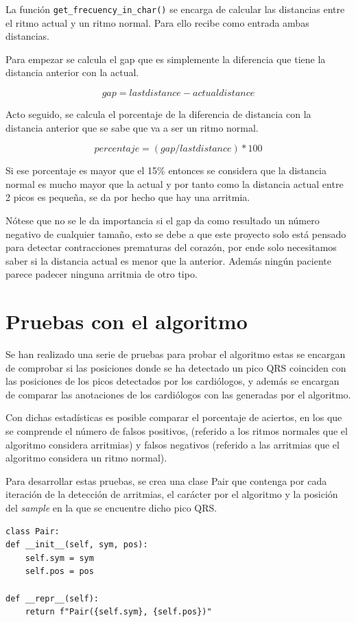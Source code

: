 \FloatBarrier

La función \lstinline{get_frecuency_in_char()} se encarga de calcular las distancias entre el ritmo actual y un ritmo normal. 
Para ello recibe como entrada ambas distancias.

Para empezar se calcula el gap que es simplemente la diferencia que tiene la distancia anterior con la actual.

\[gap = last distance - actual distance\]

Acto seguido, se calcula el porcentaje de la diferencia de distancia con la distancia anterior que se sabe que va a ser 
un ritmo normal.

\[percentaje = (gap / last distance) * 100\]

Si ese porcentaje es mayor que el 15\% entonces se considera que la distancia normal es mucho mayor que la actual
y por tanto como la distancia actual entre 2 picos es pequeña, se da por hecho que hay una arritmia.

Nótese que no se le da importancia si el gap da como resultado un número negativo de cualquier tamaño, esto se debe
a que este proyecto solo está pensado para detectar contracciones prematuras del corazón, por ende solo necesitamos 
saber si la distancia actual es menor que la anterior. Además ningún paciente parece padecer ninguna arritmia de otro
tipo.

\section{Pruebas con el algoritmo}

Se han realizado una serie de pruebas para probar el algoritmo estas se encargan de comprobar si las posiciones donde
se ha detectado un pico QRS coinciden con las posiciones de los picos detectados por los cardiólogos, y además se 
encargan de comparar las anotaciones de los cardiólogos con las generadas por el algoritmo.

Con dichas estadísticas es posible comparar el porcentaje de aciertos, en los que se comprende el número de 
falsos positivos, (referido a los ritmos normales que el algoritmo considera arritmias) y 
falsos negativos (referido a las arritmias que el algoritmo considera un ritmo normal).

Para desarrollar estas pruebas, se crea una clase Pair que contenga por cada iteración de la detección de arritmias, el carácter 
por el algoritmo y la posición del \textit{sample} en la que se encuentre dicho pico QRS.
\newpage
\lstset{language=python, breaklines=true, basicstyle=\footnotesize}
\begin{lstlisting}[frame=single]
class Pair:
def __init__(self, sym, pos):
    self.sym = sym
    self.pos = pos

def __repr__(self):
    return f"Pair({self.sym}, {self.pos})"

\end{lstlisting}

